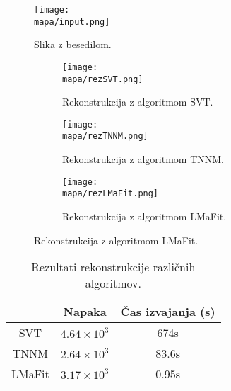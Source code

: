 \renewcommand{\mapa}{Poglavja/Slike/besedilo}

\begin{figure}[!ht]
    \centering
    \texttt{[image: \\mapa/input.png]}
    \caption{Slika z besedilom.}
\end{figure}

\begin{figure}[!ht]
    \begin{subfigure}{0.325\linewidth}
        \texttt{[image: \\mapa/rezSVT.png]}
        \caption{Rekonstrukcija z algoritmom SVT.}
    \end{subfigure}
    \hfill
    \begin{subfigure}{0.325\linewidth}
        \texttt{[image: \\mapa/rezTNNM.png]}
        \caption{Rekonstrukcija z algoritmom TNNM.}
    \end{subfigure}
    \hfill
    \begin{subfigure}{0.325\linewidth}
        \texttt{[image: \\mapa/rezLMaFit.png]}
        \caption{Rekonstrukcija z algoritmom LMaFit.}
    \end{subfigure}
\end{figure}

\begin{table}[!ht]
    \centering
    \begin{tabular}{|c|c|c|}
    \hline
    & Napaka & Čas izvajanja (s) \\
    \hline
    SVT & $4.64 \times 10^{3}$ & 674s \\
    TNNM & $2.64 \times 10^{3}$ & 83.6s \\
    LMaFit & $3.17 \times 10^{3}$ & 0.95s \\
    \hline
    \end{tabular}
    \caption{Rezultati rekonstrukcije različnih algoritmov.}
\end{table}